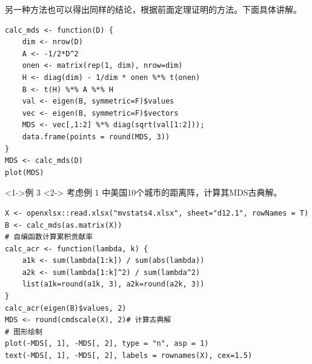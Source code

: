 \documentclass[UTF8, compress]{ctexbeamer}
\begin{document}
	\begin{frame}[fragile]
		\pause
		
		另一种方法也可以得出同样的结论，根据前面定理证明的方法。下面具体讲解。
		
		\pause
		
\begin{lstlisting}[style=A]
calc_mds <- function(D) {
    dim <- nrow(D)
    A <- -1/2*D^2
    onen <- matrix(rep(1, dim), nrow=dim)
    H <- diag(dim) - 1/dim * onen %*% t(onen)
    B <- t(H) %*% A %*% H
    val <- eigen(B, symmetric=F)$values
    vec <- eigen(B, symmetric=F)$vectors
    MDS <- vec[,1:2] %*% diag(sqrt(val[1:2])); 
    data.frame(points = round(MDS, 3))
}
MDS <- calc_mds(D)
plot(MDS)
\end{lstlisting}
		
	\end{frame}
	
	
	
	\begin{frame}[fragile]
		\begin{exampleblock}<1->{\heiti 例 3 }<2->
			考虑例 1 中美国10个城市的距离阵，计算其MDS古典解。
		\end{exampleblock}
		\vspace{-.2cm}
		
\begin{lstlisting}[style=A]
X <- openxlsx::read.xlsx("mvstats4.xlsx", sheet="d12.1", rowNames = T)
B <- calc_mds(as.matrix(X))
# 自编函数计算累积贡献率
calc_acr <- function(lambda, k) {
    a1k <- sum(lambda[1:k]) / sum(abs(lambda))
    a2k <- sum(lambda[1:k]^2) / sum(lambda^2)
    list(a1k=round(a1k, 3), a2k=round(a2k, 3))
}
calc_acr(eigen(B)$values, 2)
MDS <- round(cmdscale(X), 2)# 计算古典解
# 图形绘制
plot(-MDS[, 1], -MDS[, 2], type = "n", asp = 1)
text(-MDS[, 1], -MDS[, 2], labels = rownames(X), cex=1.5)
\end{lstlisting}
		
	\end{frame}
	
\end{document}

